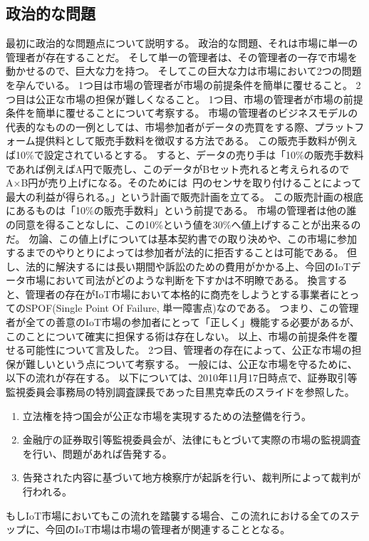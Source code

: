 \subsection{政治的な問題}
最初に政治的な問題点について説明する。
政治的な問題、それは市場に単一の管理者が存在することだ。
そして単一の管理者は、その管理者の一存で市場を動かせるので、巨大な力を持つ。
そしてこの巨大な力は市場において2つの問題を孕んでいる。
1つ目は市場の管理者が市場の前提条件を簡単に覆せること。
2つ目は公正な市場の担保が難しくなること。
1つ目、市場の管理者が市場の前提条件を簡単に覆せることについて考察する。
市場の管理者のビジネスモデルの代表的なものの一例としては、市場参加者がデータの売買をする際、プラットフォーム提供料として販売手数料を徴収する方法である。
この販売手数料が例えば10\%で設定されているとする。
すると、データの売り手は「10\%の販売手数料であれば例えばA円で販売し、このデータがBセット売れると考えられるのでA×B円が売り上げになる。そのためには~円のセンサを取り付けることによって最大の利益が得られる。」という計画で販売計画を立てる。
この販売計画の根底にあるものは「10\%の販売手数料」という前提である。
市場の管理者は他の誰の同意を得ることなしに、この10\%という値を30\%へ値上げすることが出来るのだ。
勿論、この値上げについては基本契約書での取り決めや、この市場に参加するまでのやりとりによっては参加者が法的に拒否することは可能である。
但し、法的に解決するには長い期間や訴訟のための費用がかかる上、今回のIoTデータ市場において司法がどのような判断を下すかは不明瞭である。
換言すると、管理者の存在がIoT市場において本格的に商売をしようとする事業者にとってのSPOF(Single Point Of Failure, 単一障害点)なのである。
つまり、この管理者が全ての善意のIoT市場の参加者にとって「正しく」機能する必要があるが、このことについて確実に担保する術は存在しない。
以上、市場の前提条件を覆せる可能性について言及した。
2つ目、管理者の存在によって、公正な市場の担保が難しいという点について考察する。
一般には、公正な市場を守るために、以下の流れが存在する。
以下については、2010年11月17日時点で、証券取引等監視委員会事務局の特別調査課長であった目黒克幸氏のスライド\cite{kousei_torihiki}を参照した。
\begin{enumerate}
\item 立法権を持つ国会が公正な市場を実現するための法整備を行う。
\item 金融庁の証券取引等監視委員会が、法律にもとづいて実際の市場の監視調査を行い、問題があれば告発する。
\item 告発された内容に基づいて地方検察庁が起訴を行い、裁判所によって裁判が行われる。
\end{enumerate}
もしIoT市場においてもこの流れを踏襲する場合、この流れにおける全てのステップに、今回のIoT市場は市場の管理者が関連することとなる。
